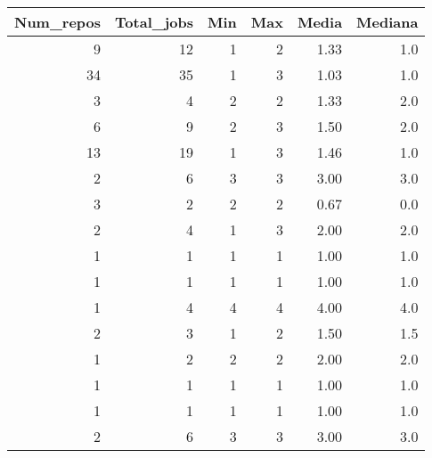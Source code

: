 \begin{tabular}{rrrrrr}
\toprule
 Num\_repos &  Total\_jobs &  Min &  Max &  Media &  Mediana \\
\midrule
         9 &          12 &    1 &    2 &   1.33 &      1.0 \\
        34 &          35 &    1 &    3 &   1.03 &      1.0 \\
         3 &           4 &    2 &    2 &   1.33 &      2.0 \\
         6 &           9 &    2 &    3 &   1.50 &      2.0 \\
        13 &          19 &    1 &    3 &   1.46 &      1.0 \\
         2 &           6 &    3 &    3 &   3.00 &      3.0 \\
         3 &           2 &    2 &    2 &   0.67 &      0.0 \\
         2 &           4 &    1 &    3 &   2.00 &      2.0 \\
         1 &           1 &    1 &    1 &   1.00 &      1.0 \\
         1 &           1 &    1 &    1 &   1.00 &      1.0 \\
         1 &           4 &    4 &    4 &   4.00 &      4.0 \\
         2 &           3 &    1 &    2 &   1.50 &      1.5 \\
         1 &           2 &    2 &    2 &   2.00 &      2.0 \\
         1 &           1 &    1 &    1 &   1.00 &      1.0 \\
         1 &           1 &    1 &    1 &   1.00 &      1.0 \\
         2 &           6 &    3 &    3 &   3.00 &      3.0 \\
\bottomrule
\end{tabular}
